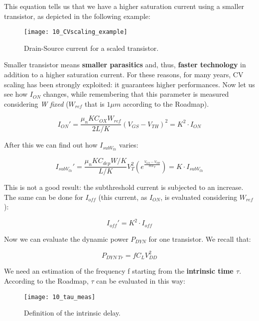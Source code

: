 \documentclass[a4paper, 12pt, twoside, openright]{report}
\begin{document}
\begin{enumerate}
This equation tells us that we have a higher saturation current using a smaller transistor, as depicted in the following example:

	\begin{figure}[H]
	\centering
	\texttt{[image: 10\_CVscaling\_example]}
	\caption{Drain-Source current for a scaled transistor.}
	\label{}
	\end{figure}

Smaller transistor means \textbf{smaller parasitics} and, thus, \textbf{faster technology} in addition to a higher saturation current. For these reasons, for many years, CV scaling has been strongly exploited: it guarantees higher performances.
Now let us see how $I_{ON}$ changes, while remembering that this parameter is measured considering \emph{W fixed} ($W_{ref}$ that is $1 \mu m$ according to the Roadmap).

	\begin{equation}
	I_{ON}' = \frac{\mu_n K C_{OX} W_{ref}}{2 L/K}(V_{GS} - V_{TH})^2 = K^2 \cdot I_{ON}
	\end{equation}

After this we can find out how $I_{subV_{th}}$ varies:

	\begin{equation}
	I_{subV_{th}}' = \frac{\mu_n K C_{dep} W/K}{L/K} V_{T}^2 \left( e^{\frac{V_{GS} - V_{TH}}{mV_T}} \right) = K \cdot I_{subV_{th}}
	\end{equation}

This is not a good result: the subthreshold current is subjected to an increase.
The same can be done for $I_{off}$ (this current, as $I_{ON}$, is evaluated considering $W_{ref}$):

	\begin{equation}
	I_{off}' = K^2 \cdot I_{off}
	\end{equation}

Now we can evaluate the dynamic power $P_{DYN}$ for one transistor. We recall that:

	\begin{equation}
	P_{DYN \ Tr} =f C_L V_{DD}^2
	\end{equation}

We need an estimation of the frequency f starting from the \textbf{intrinsic time $\tau$}. According to the Roadmap, $\tau$ can be evaluated in this way:

	\begin{figure}[H]
	\centering
	\texttt{[image: 10\_tau\_meas]}
	\caption{Definition of the intrinsic delay.}
	\label{}
	\end{figure}


\end{enumerate}
\end{document}
